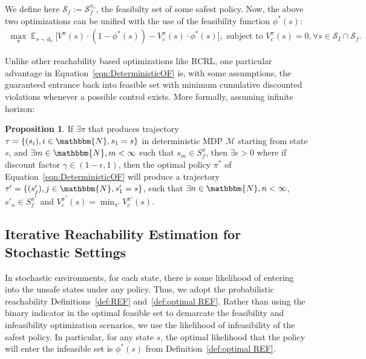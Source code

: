 \documentclass{article}
\theoremstyle{definition}
\DeclareMathOperator*{\E}{\mathbb{E}}
\newtheorem{prop}{Proposition}
\begin{document}
We define here $\mathcal S_f:=\mathcal S^{\pi_s}_f$, the feasibilty set of some safest policy. Now, the above two optimizations can be unified with the use of the feasibility function $\phi^*(s)$:
\vspace{-1pt}
\begin{equation}
\label{eqn:DeterministicOF}
\begin{split}
    \max_\pi \E_{s\sim d_0}\bigl[V^\pi(s)\cdot(1-\phi^*(s)) - V^\pi_c(s)\cdot\phi^*(s) \bigr], \text{ subject to } V^{\pi}_c (s) = 0, \forall s\in \mathcal{S}_I \cap \mathcal{S}_f.
\end{split}
\end{equation}

\vspace{-9pt}
Unlike other reachability based optimizations like RCRL, one particular advantage in Equation~\ref{eqn:DeterministicOF} is, with some assumptions, the guaranteed entrance back into feasible set with minimum cumulative discounted violations whenever a possible control exists. More formally, assuming infinite horizon:

\begin{prop}
    If $\exists\pi$ that produces trajectory $\tau=\{(s_i),i\in\mathbbm{N}, s_1=s\}$ in deterministic MDP $\mathcal{M}$ starting from state $s$, and $\exists m\in \mathbbm{N}, m<\infty$ such that $s_m\in S^\pi_f$, then $\exists \epsilon>0$ where if discount factor $\gamma\in (1-\epsilon,1)$, then the optimal policy $\pi^*$ of Equation~\ref{eqn:DeterministicOF} will produce a trajectory $\tau'=\{(s'_j),j\in\mathbbm{N}, s'_1=s\}$, such that $\exists n\in \mathbbm{N}, n<\infty$, $s'_n\in S^{\pi^*}_f$ and $V^{\pi^*}_c(s)=\min_{\pi'} V^{\pi'}_c(s)$.
    
    
\end{prop}

\vspace{-5pt}
\subsection{Iterative Reachability Estimation for Stochastic Settings}
\label{section:StochasticOPF}


In stochastic environments, for each state, there is some likelihood of entering into the unsafe states under any policy. Thus, we adopt the probabilistic reachability Definitions~\ref{def:REF} and~\ref{def:optimal REF}. Rather than using the binary indicator in the optimal feasible set to demarcate the feasibility and infeasibility optimization scenarios, we use the likelihood of infeasibility of the safest policy. In particular, for any state $s$, the optimal likelihood that the policy will enter the infeasible set is $\phi^*(s)$ from Definition~\ref{def:optimal REF}.
\end{document}
